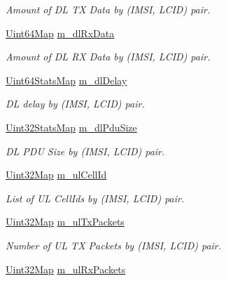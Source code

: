 \begin{DoxyCompactItemize}
\begin{DoxyCompactList}\small\item\em Amount of DL TX Data by (I\+M\+SI, L\+C\+ID) pair. \end{DoxyCompactList}\item 
\hyperlink{namespacens3_a02246d7bb546e26a989e837a36d17797}{Uint64\+Map} \hyperlink{classns3_1_1RadioBearerStatsCalculator_a0a201ca03299a0ab3729b651cc5731f0}{m\+\_\+dl\+Rx\+Data}
\begin{DoxyCompactList}\small\item\em Amount of DL RX Data by (I\+M\+SI, L\+C\+ID) pair. \end{DoxyCompactList}\item 
\hyperlink{namespacens3_a302499faee8d6f35953a73b52b34c421}{Uint64\+Stats\+Map} \hyperlink{classns3_1_1RadioBearerStatsCalculator_a017df18cf72557c4dd14cd3552e58361}{m\+\_\+dl\+Delay}
\begin{DoxyCompactList}\small\item\em DL delay by (I\+M\+SI, L\+C\+ID) pair. \end{DoxyCompactList}\item 
\hyperlink{namespacens3_a024aec20f35b29a93b5bfcaacf8ce269}{Uint32\+Stats\+Map} \hyperlink{classns3_1_1RadioBearerStatsCalculator_aa0a963def36ef9971ce70977f880edd5}{m\+\_\+dl\+Pdu\+Size}
\begin{DoxyCompactList}\small\item\em DL P\+DU Size by (I\+M\+SI, L\+C\+ID) pair. \end{DoxyCompactList}\item 
\hyperlink{namespacens3_abfd8d9eba8902c110c885a991a0529cd}{Uint32\+Map} \hyperlink{classns3_1_1RadioBearerStatsCalculator_ada3352c06cc37fb640ae3106313d42f8}{m\+\_\+ul\+Cell\+Id}
\begin{DoxyCompactList}\small\item\em List of UL Cell\+Ids by (I\+M\+SI, L\+C\+ID) pair. \end{DoxyCompactList}\item 
\hyperlink{namespacens3_abfd8d9eba8902c110c885a991a0529cd}{Uint32\+Map} \hyperlink{classns3_1_1RadioBearerStatsCalculator_a00874c8bd4409c6bbdbccc6be27058ee}{m\+\_\+ul\+Tx\+Packets}
\begin{DoxyCompactList}\small\item\em Number of UL TX Packets by (I\+M\+SI, L\+C\+ID) pair. \end{DoxyCompactList}\item 
\hyperlink{namespacens3_abfd8d9eba8902c110c885a991a0529cd}{Uint32\+Map} \hyperlink{classns3_1_1RadioBearerStatsCalculator_aa0dbc431bac8ffeab3140b5b468a3fd8}{m\+\_\+ul\+Rx\+Packets}

\end{DoxyCompactItemize}
